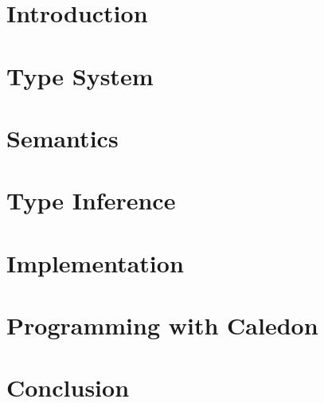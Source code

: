 \documentclass[12pt]{cmuthesis}
\begin{document}
\newtheorem{tcase}{Case}
      
\chapter{Introduction}
    
    
     
\chapter{Type System}
    
     
    
    
  
\chapter{Semantics}
    
    
    
    
    
    
          
\chapter{Type Inference} 
    
     
    
    
             
\chapter{Implementation}
    
    
     
    
    
 
\chapter{Programming with Caledon}
    
    
  
\chapter{Conclusion}
   
   
    
\appendix
 
\end{document}

